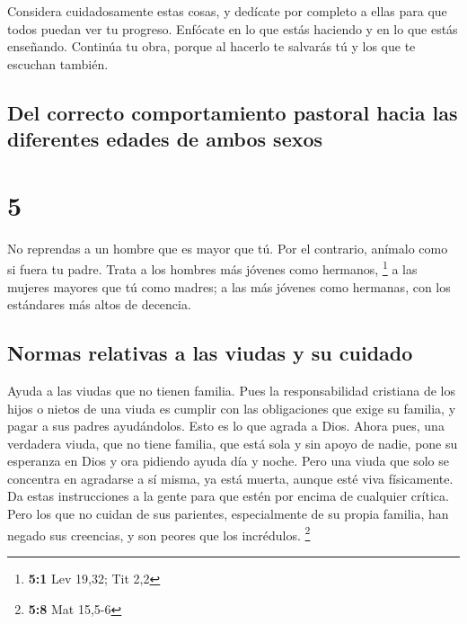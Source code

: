  Considera cuidadosamente estas cosas, y dedícate por
completo a ellas para que todos puedan ver tu progreso. 
Enfócate en lo que estás haciendo y en lo que estás enseñando. Continúa
tu obra, porque al hacerlo te salvarás tú y los que te escuchan también.

\hypertarget{del-correcto-comportamiento-pastoral-hacia-las-diferentes-edades-de-ambos-sexos}{%
\subsection{Del correcto comportamiento pastoral hacia las diferentes
edades de ambos
sexos}\label{del-correcto-comportamiento-pastoral-hacia-las-diferentes-edades-de-ambos-sexos}}

\hypertarget{section-4}{%
\section{5}\label{section-4}}

 No reprendas a un hombre que es mayor que tú. Por el
contrario, anímalo como si fuera tu padre. Trata a los hombres más
jóvenes como hermanos, \footnote{\textbf{5:1} Lev 19,32; Tit 2,2}
 a las mujeres mayores que tú como madres; a las más
jóvenes como hermanas, con los estándares más altos de decencia.

\hypertarget{normas-relativas-a-las-viudas-y-su-cuidado}{%
\subsection{Normas relativas a las viudas y su
cuidado}\label{normas-relativas-a-las-viudas-y-su-cuidado}}

 Ayuda a las viudas que no tienen familia. 
Pues la responsabilidad cristiana de los hijos o nietos de una viuda es
cumplir con las obligaciones que exige su familia, y pagar a sus padres
ayudándolos. Esto es lo que agrada a Dios.  Ahora pues,
una verdadera viuda, que no tiene familia, que está sola y sin apoyo de
nadie, pone su esperanza en Dios y ora pidiendo ayuda día y noche.
 Pero una viuda que solo se concentra en agradarse a sí
misma, ya está muerta, aunque esté viva físicamente.  Da
estas instrucciones a la gente para que estén por encima de cualquier
crítica.  Pero los que no cuidan de sus parientes,
especialmente de su propia familia, han negado sus creencias, y son
peores que los incrédulos. \footnote{\textbf{5:8} Mat 15,5-6}

